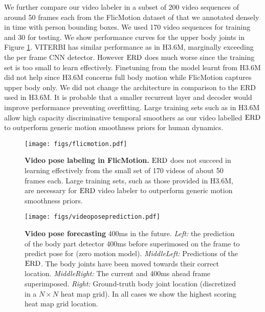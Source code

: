 \documentclass[10pt,twocolumn,letterpaper]{article}
\begin{document}
We further compare our video labeler in a subset of 200 video sequences of around 50 frames each from the FlicMotion dataset of \cite{DBLP:conf/accv/JainTLB14,MODEC} that we annotated  densely in time with person bounding boxes. We used 170 video sequences for training and 30 for testing. We show performance curves for the upper body joints in Figure \ref{fig:flic}. VITERBI has similar performance as in H3.6M, marginally exceeding the per frame CNN detector. However $\text{ERD}$ does much worse since the training set is too small to learn effectively. Finetuning from the model learnt from H3.6M did not help since H3.6M concerns full body motion while FlicMotion captures upper body only.   We did not change the architecture in comparison to the ERD used in H3.6M. It is probable that a smaller recurrent layer and decoder would improve performance preventing overfitting. Large training sets such as in H3.6M allow high capacity discriminative temporal smoothers as our video labelled $\text{ERD}$ to outperform generic motion smoothness priors  for human dynamics. 

\begin{figure}[ht]
\begin{center}
\texttt{[image: figs/flicmotion.pdf]}
\end{center}
\caption{\textbf{Video pose labeling in FlicMotion.} 
$\text{ERD}$ does not succeed in learning effectively from the small set of 170 videos of about 50 frames each. Large training sets, such as those provided in H3.6M, are necessary for $\text{ERD}$ video labeler to outperform generic motion smoothness priors. }
\label{fig:flic}
\end{figure}


\begin{figure}[ht]
 \begin{center}
 \texttt{[image: figs/videoposeprediction.pdf]}
 \end{center}
\caption{\textbf{Video pose forecasting}  400ms in the future. \textit{Left:} the prediction of the body part detector 400ms before superimosed on the frame to predict pose for (zero motion model). \textit{MiddleLeft:} Predictions of the $\text{ERD}$. The body joints have been moved towards their correct location. \textit{MiddleRight:} The current and 400ms ahead frame superimposed. \textit{Right:} Ground-truth body joint location (discretized in a $N \times N$ heat map grid). In all cases we show the highest scoring heat map grid location. }
 \label{fig:videoprediction}
 \end{figure}
\end{document}
